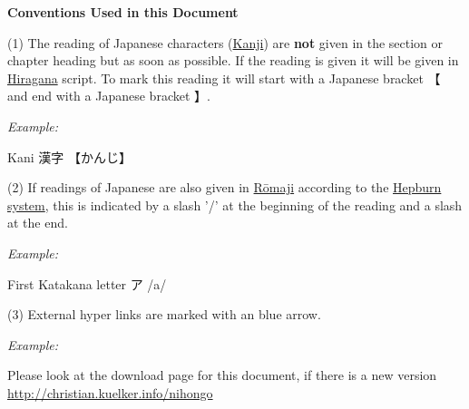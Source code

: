 \bigskip

\textbf{Conventions Used in this Document}\label{para:Conventions}

\bigskip

(1) The reading of Japanese characters (\hyperref[sec:Kanji]{Kanji}) are
\textbf{not} given in the section or chapter heading but as soon as possible.
If the reading is given it will be given in \hyperref[sec:Hiragana]{Hiragana}
script. To mark this reading it will start with a Japanese bracket {【} and end
with a Japanese bracket {】}.

\bigskip
\textit{Example:}

\bigskip
\begin{center}
     Kani {漢字} {【かんじ】}
\end{center}

\bigskip

(2) If readings of Japanese are also given in \hyperref[sec:Romaji]{Rōmaji}
according to the \hyperref[sec:Hepburn]{Hepburn system}, this is indicated by a
slash '/' at the beginning of the reading and a slash at the end.

\bigskip
\textit{Example:}

\bigskip
\begin{center}
     First Katakana letter {ア} {/a/}
\end{center}

\bigskip

(3) External hyper links are marked with an blue arrow.

\bigskip
\textit{Example:}

\bigskip
\begin{center}
     Please look at the download page for this document, if there is a new
     version\\ \Link
     \href{http://christian.kuelker.info/nihongo}{http://christian.kuelker.info/nihongo}
\end{center}

